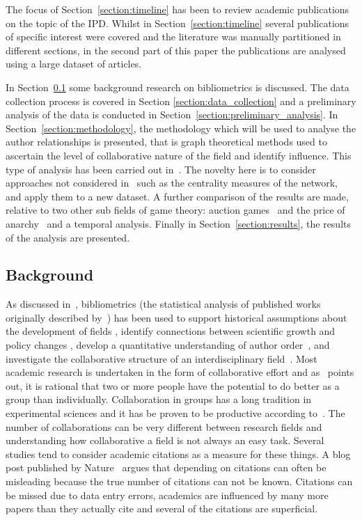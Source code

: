 \documentclass{article}
\theoremstyle{definition}
\begin{document}
The focus of Section~\ref{section:timeline} has been to review academic
publications on the topic of the IPD. Whilst in
Section~\ref{section:timeline} several publications of specific interest were
covered and the literature was manually partitioned in different sections, in
the second part of this paper the publications are analysed using a large
dataset of articles.

In Section~\ref{section:background} some background research on bibliometrics is
discussed. The data collection process is covered in Section
\ref{section:data_collection} and a preliminary analysis of the data is
conducted in Section~\ref{section:preliminary_analysis}. In
Section~\ref{section:methodology}, the methodology which will be used to analyse
the author relationships is presented, that is graph theoretical methods used to
ascertain the level of collaborative nature of the field and identify influence.
This type of analysis has been carried out in~\cite{Liu2015}. The novelty here
is to consider approaches not considered in~\cite{Liu2015} such as the
centrality measures of the network, and apply them to a new dataset. A further
comparison of the results are made, relative to two other sub fields of game
theory: auction games~\cite{menezes2005} and the price of
anarchy~\cite{roughgarden2005} and a temporal analysis. Finally in
Section~\ref{section:results}, the results of the analysis are presented.

\subsection{Background}\label{section:background}

As discussed in~\cite{youngblood2018}, bibliometrics (the statistical analysis
of published works originally described by~\cite{pritchard1969}) has been used
to support historical assumptions about the development of fields
\cite{raina1998}, identify connections between scientific growth and policy
changes \cite{das2016}, develop a quantitative understanding of author
order~\cite{sekara2018}, and investigate the collaborative structure of an
interdisciplinary field~\cite{Liu2015}. Most academic research is undertaken in
the form of collaborative effort and as~\cite{Kyvik2017} points out, it is
rational that two or more people have the potential to do better as a group
than individually. Collaboration in groups has a long tradition in experimental
sciences and it has be proven to be productive according
to~\cite{Etzkowitz1992}. The number of collaborations can be very different
between research fields and understanding how collaborative a field is not
always an easy task. Several studies tend to consider academic citations as a
measure for these things. A blog post published by Nature~\cite{nature_blog}
argues that depending on citations can often be misleading because the true
number of citations can not be known. Citations can be missed due to data entry
errors, academics are influenced by many more papers than they actually cite and
several of the citations are superficial.
\end{document}
